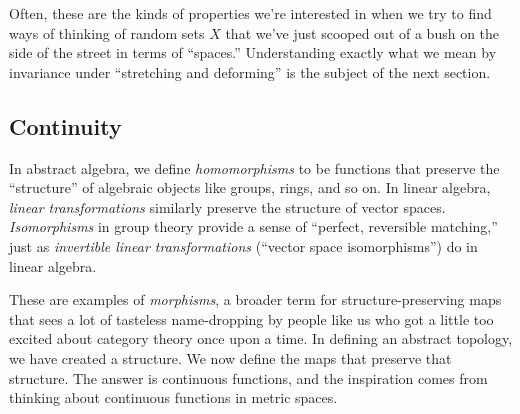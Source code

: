 \documentclass{fkpaper}
\begin{document}
\begin{multicols}{2}
  Often, these are the kinds of properties we're interested in when we
  try to find ways of thinking of {random sets $X$ that we've just
    scooped out of a bush on the side of the street in terms of
    ``spaces.''} Understanding exactly what we mean by invariance
  under ``stretching and deforming'' is the subject of the next
  section.


  \subsection{Continuity}
  In abstract algebra, we define \emph{homomorphisms} to be functions
  that preserve the ``structure'' of algebraic objects like groups,
  rings, and so on. In linear algebra, \emph{linear transformations}
  similarly preserve the structure of vector spaces.
  \emph{Isomorphisms} in group theory provide a sense of ``perfect,
  reversible matching,'' just as \emph{invertible linear
    transformations} (``vector space isomorphisms'') do in linear
  algebra.

  These are examples of \emph{morphisms}, a broader term for
  structure-preserving maps {that sees a lot of tasteless
    name-dropping by people like us who got a little too excited about
    category theory once upon a time.} In defining an abstract
  topology, we have created a structure. We now define the maps that
  preserve that structure. The answer is continuous functions, and the
  inspiration comes from thinking about continuous functions in metric
  spaces.


\end{multicols}
\end{document}
